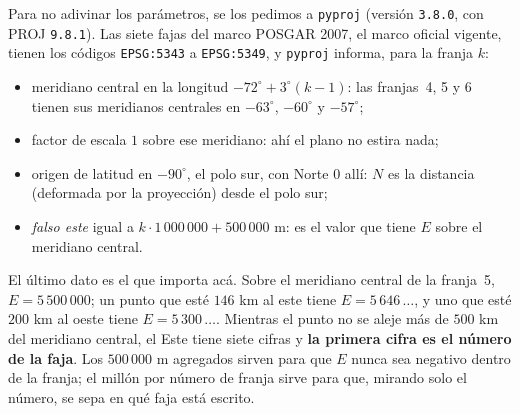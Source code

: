 Para no adivinar los parámetros, se los pedimos a \texttt{pyproj} (versión \texttt{3.8.0}, con PROJ
\texttt{9.8.1}). Las siete fajas del marco POSGAR 2007, el marco oficial vigente, tienen los códigos
\texttt{EPSG:5343} a \texttt{EPSG:5349}, y \texttt{pyproj} informa, para la franja \(k\):
\begin{itemize}
  \item meridiano central en la longitud \(-72^\circ+3^\circ(k-1)\): las franjas~4, 5 y 6 tienen
  sus meridianos centrales en \(-63^\circ\), \(-60^\circ\) y \(-57^\circ\);
  \item factor de escala \(1\) sobre ese meridiano: ahí el plano no estira nada;
  \item origen de latitud en \(-90^\circ\), el polo sur, con Norte \(0\) allí: \(N\) es la
  distancia (deformada por la proyección) desde el polo sur;
  \item \emph{falso este} igual a \(k\cdot1\,000\,000+500\,000\) m: es el valor que tiene \(E\)
  sobre el meridiano central.
\end{itemize}
El último dato es el que importa acá. Sobre el meridiano central de la franja~5, \(E=5\,500\,000\);
un punto que esté \(146\) km al este tiene \(E=5\,646\,\ldots\), y uno que esté \(200\) km al
oeste tiene \(E=5\,300\,\ldots\). Mientras el punto no se aleje más de \(500\) km del meridiano
central, el Este tiene siete cifras y \textbf{la primera cifra es el número de la faja}. Los
\(500\,000\) m agregados sirven para que \(E\) nunca sea negativo dentro de la franja; el millón
por número de franja sirve para que, mirando solo el número, se sepa en qué faja está escrito.

